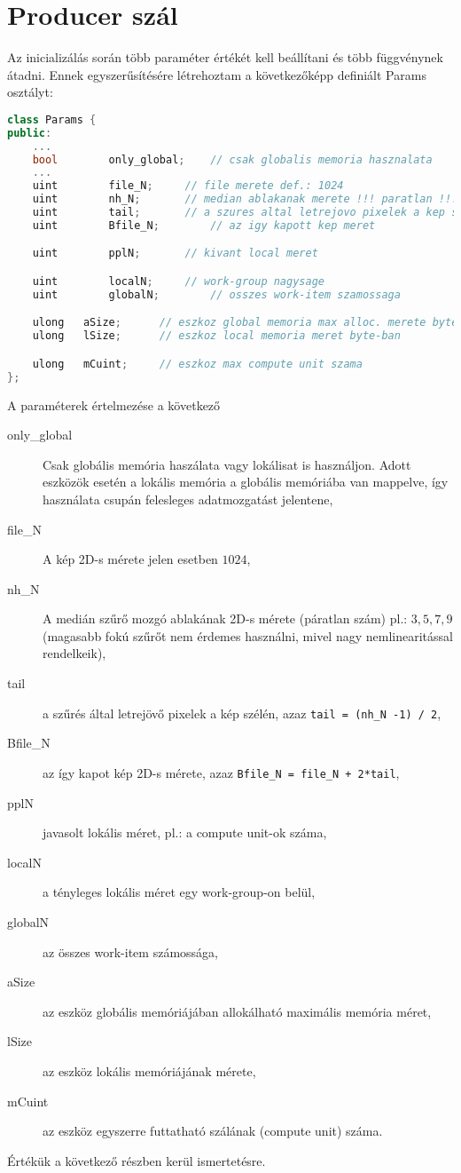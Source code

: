 \section{Producer szál}
	Az inicializálás során több paraméter értékét kell beállítani és több függvénynek átadni. Ennek egyszerűsítésére létrehoztam a
	következőképp definiált Params osztályt:
\begin{lstlisting}[language=C++]	
class Params {
public:
	...
	bool		only_global;	// csak globalis memoria hasznalata
	...
	uint		file_N;		// file merete def.: 1024
	uint		nh_N;		// median ablakanak merete !!! paratlan !!!
	uint		tail;		// a szures altal letrejovo pixelek a kep szelen 
	uint		Bfile_N;		// az igy kapott kep meret

	uint		pplN;		// kivant local meret

	uint		localN;		// work-group nagysage
	uint		globalN;		// osszes work-item szamossaga

	ulong	aSize;		// eszkoz global memoria max alloc. merete byte-ban
	ulong	lSize;		// eszkoz local memoria meret byte-ban

	ulong	mCuint;		// eszkoz max compute unit szama
};
\end{lstlisting}
	A paraméterek értelmezése a következő
	\begin{description}
	\item[only\_global] Csak globális memória haszálata vagy lokálisat is használjon. Adott eszközök esetén a lokális memória a
	globális memóriába van mappelve, így használata csupán felesleges adatmozgatást jelentene,
	\item[file\_N] A kép 2D-s mérete jelen esetben $1024$,
	\item[nh\_N] A medián szűrő mozgó ablakának 2D-s mérete (páratlan szám) pl.: $3,5,7,9$ (magasabb fokú szűrőt nem érdemes
	használni, mivel nagy nemlinearitással rendelkeik),
	\item[tail] a szűrés által letrejövő pixelek a kép szélén, azaz \texttt{tail = (nh\_N -1) / 2},
	\item[Bfile\_N] az így kapot kép 2D-s mérete, azaz \texttt{Bfile\_N = file\_N + 2*tail},
	\item[pplN] javasolt lokális méret, pl.: a compute unit-ok száma,
	\item[localN] a tényleges lokális méret egy work-group-on belül,
	\item[globalN] az összes work-item számossága,
	\item[aSize] az eszköz globális memóriájában allokálható maximális memória méret,
	\item[lSize] az eszköz lokális memóriájának mérete,
	\item[mCuint] az eszköz egyszerre futtatható szálának (compute unit) száma.
	\end{description}
	Értékük a következő részben kerül ismertetésre.
	
